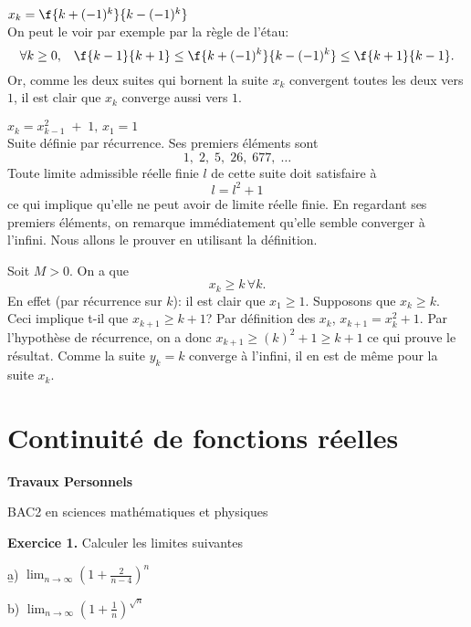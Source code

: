 \vspace{0.5cm}
 $x_k = \f{k+(-1)^k}{k-(-1)^k}$\\

\noindent On peut le voir par exemple par la règle de l'étau:
\[\forall k \geq 0, \;\;\; \f{k-1}{k+1} \leq \f{k+(-1)^k}{k-(-1)^k} \leq \f{k+1}{k-1}. \]
Or, comme les deux suites qui bornent la suite $x_k$ convergent toutes les deux vers $1$, il est clair que $x_k$ converge aussi vers $1$.


\vspace{0.5cm}
 $x_k = x_{k-1}^2\;+\;1,\, x_1=1$\\

\noindent Suite définie par récurrence. Ses premiers éléments sont \[1, \; 2, \; 5, \;  26, \; 677, \; \ldots\]
Toute  limite admissible réelle finie $l$  de cette suite doit satisfaire à \[l=l^2+1\] ce qui implique qu'elle ne peut avoir de limite réelle finie. En regardant ses premiers éléments, on remarque immédiatement qu'elle semble converger à l'infini. Nous allons le prouver en utilisant la définition.

\noindent Soit $M> 0$. On a que \[x_k \geq k \, \forall k.\] En effet (par récurrence sur $k$): il est clair que $x_1 \geq 1$. Supposons que $x_k \geq k$. Ceci implique t-il que $x_{k+1}\geq k+1$? Par définition des $x_k$, $x_{k+1} = x_k^2+1$. Par l'hypothèse de récurrence, on a donc $x_{k+1}\geq (k)^2 +1\geq k+1$ ce qui prouve le résultat. Comme la suite $y_k=k$ converge à l'infini, il en est de même pour la suite $x_k$.



\section{Continuité de fonctions réelles}


\begin{center}
\LARGE \bf
Travaux Personnels 
\end{center}

\begin{bf}
\begin{center}
BAC2 en sciences mathématiques et physiques
\end{center}
\end{bf}

{\bf Exercice 1.} Calculer les limites suivantes

\b
a) $\displaystyle \lim_{n \to \infty} \left( 1+ \frac{2}{n-4} \right)^n$

\medskip
b) 
$\displaystyle \lim_{n \to \infty} 
         \left( 1+ \frac 1n \right)^{\sqrt{n}}$


